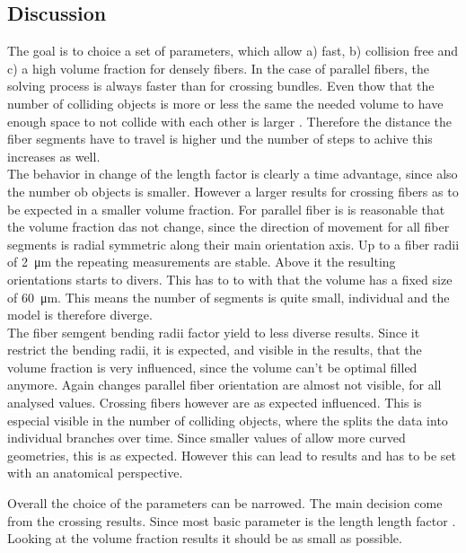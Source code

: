\subsection{Discussion}
% 
The goal is to choice a set of parameters, which allow a) fast, b) collision free and c) a high volume fraction for densely fibers.
In the case of parallel fibers, the solving process is always faster than for crossing bundles.
Even thow that the number of colliding objects is more or less \dummy{} the same  the needed volume to have enough space to not collide with each other is larger \dummy{}.
Therefore the distance the fiber segments have to travel is higher und the number of steps to achive this increases as well.
\\
% 
The behavior in change of the length factor \segLengthFactor{} is clearly a time advantage, since also the number ob objects is smaller.
However a larger \segLengthFactor{} results for crossing fibers as to be expected in a smaller volume fraction.
For parallel fiber is is reasonable that the volume fraction das not change, since the direction of movement for all fiber segments is radial symmetric along their main orientation axis.
Up to a fiber radii of \SI{2}{\micro\meter} the repeating measurements are stable.
Above it the resulting orientations starts to divers.
This has to to with that the volume has a fixed size of \SI{60}{\micro\meter}.
This means the number of segments is quite small, individual and the model is therefore diverge.
\\
The fiber semgent bending radii factor \segRadiusFactor{} yield to less diverse results.
Since it restrict the bending radii, it is expected, and visible in the results, that the volume fraction is very influenced, since the volume can't be optimal filled anymore.
Again changes parallel fiber orientation are almost not visible, for all analysed values.
Crossing fibers however are as expected influenced.
This is especial visible in the number of colliding objects, where the \segRadiusFactor{} splits the data into individual branches over time.
Since smaller values of \segRadiusFactor{} allow more curved geometries, this is as expected.
However this can lead to  results and has to be set with an anatomical perspective. 
\par
% 
Overall the choice of the parameters can be narrowed.
The main decision come from the crossing results.
Since most basic parameter is the length length factor \segLengthFactor{}.
Looking at the volume fraction results it should be as small as possible.
